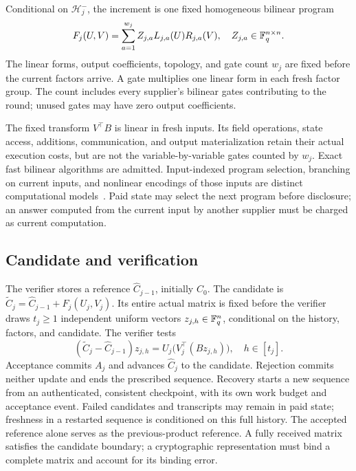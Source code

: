 \begin{definition}\label{def:fresh-program}
Conditional on $\mathcal H_j^-$, the increment is one fixed homogeneous
bilinear program
\begin{equation}\label{eq:fresh-program}
F_j(U,V)=\sum_{a=1}^{w_j}Z_{j,a}L_{j,a}(U)R_{j,a}(V),
\quad Z_{j,a}\in\mathbb F_q^{n\times n}.
\end{equation}
The linear forms, output coefficients, topology, and gate count $w_j$
are fixed before the current factors arrive. A gate multiplies one linear
form in each fresh factor group. The count includes every supplier's
bilinear gates contributing to the round; unused gates may have zero
output coefficients.
\end{definition}

The fixed transform $V^\top B$ is linear in fresh inputs. Its field
operations, state access, additions, communication, and output
materialization retain their actual execution costs, but are not the
variable-by-variable gates counted by $w_j$. Exact fast bilinear
algorithms are admitted. Input-indexed program selection, branching on
current inputs, and nonlinear encodings of those inputs are distinct
computational models~\cite{alman_lookup}. Paid state may select the next
program before disclosure; an answer computed from the current input by
another supplier must be charged as current computation.

\subsection{Candidate and verification}
The verifier stores a reference $\widehat C_{j-1}$, initially $C_0$.
The candidate is
$\widetilde C_j=\widehat C_{j-1}+F_j(U_j,V_j)$.
Its entire actual matrix is fixed before the verifier draws $t_j\ge1$
independent uniform vectors $z_{j,h}\in\mathbb F_q^n$, conditional on the
history, factors, and candidate. The verifier tests
\begin{equation}\label{eq:fresh-check}
(\widetilde C_j-\widehat C_{j-1})z_{j,h}
=U_j\bigl(V_j^\top(Bz_{j,h})\bigr),\quad h\in[t_j].
\end{equation}
Acceptance commits $A_j$ and advances $\widehat C_j$ to the candidate.
Rejection commits neither update and ends the prescribed sequence.
Recovery starts a new sequence from an authenticated, consistent checkpoint,
with its own work budget and acceptance event. Failed candidates and
transcripts may remain in paid state; freshness in a restarted sequence
is conditioned on this full history. The accepted reference alone serves
as the previous-product reference. A fully received matrix
satisfies the candidate boundary; a cryptographic representation must
bind a complete matrix and account for its binding error.

